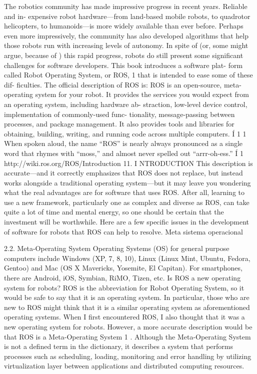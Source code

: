 The robotics community has made impressive progress in recent years. Reliable and in-
expensive robot hardware—from land-based mobile robots, to quadrotor helicopters, to
humanoids—is more widely available than ever before. Perhaps even more impressively,
the community has also developed algorithms that help those robots run with increasing
levels of autonomy.
In spite of (or, some might argue, because of ) this rapid progress, robots do still present
some significant challenges for software developers. This book introduces a software plat-
form called Robot Operating System, or ROS, 1 that is intended to ease some of these dif-
ficulties. The official description of ROS is:
ROS is an open-source, meta-operating system for your robot. It provides the
services you would expect from an operating system, including hardware ab-
straction, low-level device control, implementation of commonly-used func-
tionality, message-passing between processes, and package management. It
also provides tools and libraries for obtaining, building, writing, and running
code across multiple computers. Í 1
1 When spoken aloud, the name “ROS” is nearly always pronounced as a single word that rhymes with
“moss,” and almost never spelled out “arrr-oh-ess.”
Í 1 http://wiki.ros.org/ROS/Introduction
11. I NTRODUCTION
This description is accurate—and it correctly emphasizes that ROS does not replace, but
instead works alongside a traditional operating system—but it may leave you wondering
what the real advantages are for software that uses ROS. After all, learning to use a new
framework, particularly one as complex and diverse as ROS, can take quite a lot of time
and mental energy, so one should be certain that the investment will be worthwhile. Here
are a few specific issues in the development of software for robots that ROS can help to
resolve.
Meta sistema operacional

2.2. Meta-Operating System
Operating Systems (OS) for general purpose computers include Windows (XP, 7, 8, 10), Linux
(Linux Mint, Ubuntu, Fedora, Gentoo) and Mac (OS X Mavericks, Yosemite, El Capitan). For
smartphones, there are Android, iOS, Symbian, RiMO, Tizen, etc.
Is ROS a new operating system for robots?
ROS is the abbreviation for Robot Operating System, so it would be safe to say that it is an
operating system. In particular, those who are new to ROS might think that it is a similar
operating system as aforementioned operating systems. When I first encountered ROS, I also
thought that it was a new operating system for robots.
However, a more accurate description would be that ROS is a Meta-Operating System 1 .
Although the Meta-Operating System is not a defined term in the dictionary, it describes a system
that performs processes such as scheduling, loading, monitoring and error handling by utilizing
virtualization layer between applications and distributed computing resources.

